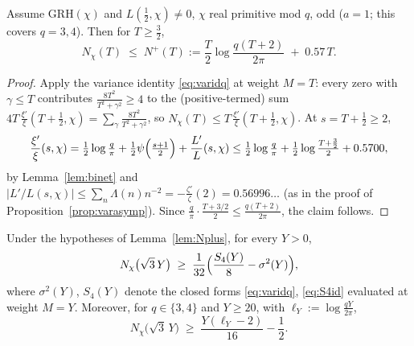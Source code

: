 \begin{lemma}\label{lem:Nplus}
Assume GRH$(\chi)$ and $L(\tfrac12,\chi)\ne0$, $\chi$ real primitive
mod $q$, odd ($a=1$; this covers $q=3,4$). Then for $T\ge\tfrac32$,
\[
N_\chi(T)\;\le\;N^+(T):=\frac T2\log\frac{q(T+2)}{2\pi}\;+\;0.57\,T .
\]
\end{lemma}

\begin{proof}
Apply the variance identity \eqref{eq:varidq} at weight $M=T$: every
zero with $\gamma\le T$ contributes
$\frac{8T^2}{T^2+\gamma^2}\ge4$ to the (positive-termed) sum
$4T\,\frac{\xi'}{\xi}(T+\tfrac12,\chi)
=\sum_\gamma\frac{8T^2}{T^2+\gamma^2}$, so
$N_\chi(T)\le T\,\frac{\xi'}{\xi}(T+\tfrac12,\chi)$. At
$s=T+\tfrac12\ge2$,
\[
\frac{\xi'}{\xi}(s,\chi)
=\tfrac12\log\tfrac q\pi+\tfrac12\psi\Bigl(\tfrac{s+1}2\Bigr)
+\frac{L'}{L}(s,\chi)
\le\tfrac12\log\tfrac q\pi+\tfrac12\log\tfrac{T+\frac32}2+0.5700,
\]
by Lemma~\ref{lem:binet} and
$|L'/L(s,\chi)|\le\sum_n\Lambda(n)n^{-2}
=-\tfrac{\zeta'}\zeta(2)=0.56996\ldots$ (as in the proof of
Proposition~\ref{prop:varasymp}). Since
$\tfrac q\pi\cdot\tfrac{T+3/2}2\le\tfrac{q(T+2)}{2\pi}$, the claim
follows.
\end{proof}

\begin{lemma}\label{lem:Nlow}
Under the hypotheses of Lemma~\ref{lem:Nplus}, for every $Y>0$,
\begin{equation}\label{eq:Nlow}
N_\chi\bigl(\sqrt3\,Y\bigr)\;\ge\;
\frac1{32}\Bigl(\frac{S_4(Y)}{8}-\sigma^2(Y)\Bigr),
\end{equation}
where $\sigma^2(Y)$, $S_4(Y)$ denote the closed forms
\eqref{eq:varidq}, \eqref{eq:S4id} evaluated at weight $M=Y$.
Moreover, for $q\in\{3,4\}$ and $Y\ge20$, with
$\ell_Y:=\log\frac{qY}{2\pi}$,
\begin{equation}\label{eq:Nlowexp}
N_\chi\bigl(\sqrt3\,Y\bigr)\;\ge\;\frac{Y(\ell_Y-2)}{16}-\frac12 .
\end{equation}
\end{lemma}

